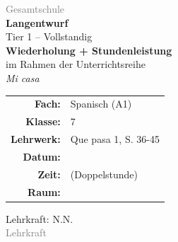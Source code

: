 \documentclass[11pt,a4paper]{article}
\newcommand{\fach}{Spanisch}
\newcommand{\jahrgangsstufe}{7}
\newcommand{\schulart}{Gesamtschule}
\newcommand{\stundenthema}{Wiederholung + Stundenleistung}
\newcommand{\reihenthema}{Mi casa}
\newcommand{\lehrkraft}{N.N.}
\newcommand{\ausbildungsstand}{Lehrkraft}
\newcommand{\gerniveau}{A1}
\newcommand{\lehrwerk}{Que pasa 1}
\newcommand{\lehrwerkseite}{S. 36-45}
\begin{document}
\begin{titlepage}
    \centering
    \vspace*{2cm}

    {\large\textcolor{gray}{\schulart}}\\[2cm]

    {\Huge\textcolor{fach}{\textbf{Langentwurf}}}\\[0.5cm]
    {\large Tier 1 -- Vollstandig}\\[2cm]

    {\LARGE\textbf{\stundenthema}}\\[0.5cm]
    {\large im Rahmen der Unterrichtsreihe}\\[0.3cm]
    {\Large\textit{\reihenthema}}\\[2cm]

    \begin{tabular}{rl}
        \textbf{Fach:} & \fach{} (\gerniveau) \\[0.3cm]
        \textbf{Klasse:} & \jahrgangsstufe \\[0.3cm]
        \textbf{Lehrwerk:} & \lehrwerk, \lehrwerkseite \\[0.3cm]
        \textbf{Datum:} & \underline{\hspace{3cm}} \\[0.3cm]
        \textbf{Zeit:} & \underline{\hspace{3cm}} (Doppelstunde) \\[0.3cm]
        \textbf{Raum:} & \underline{\hspace{3cm}} \\[0.3cm]
    \end{tabular}

    \vfill

    {\large Lehrkraft: \lehrkraft}\\[0.3cm]
    {\normalsize\textcolor{gray}{\ausbildungsstand}}\\[1cm]

\end{titlepage}

\tableofcontents
\newpage

\end{document}
